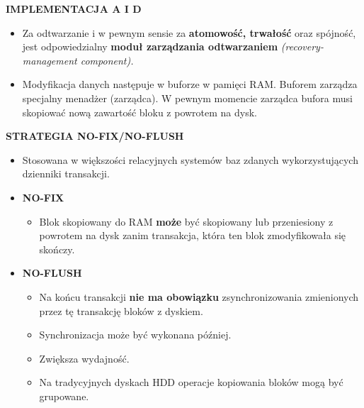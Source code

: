 \documentclass[a5paper,6pt]{article}
\begin{document}
    \textbf{IMPLEMENTACJA A I D}
    \begin{itemize}
        \item Za odtwarzanie i w pewnym sensie za \textbf{atomowość, trwałość}
              oraz spójność, jest odpowiedzialny \textbf{moduł zarządzania
              odtwarzaniem} \textit{(recovery-management component).}

        \item Modyfikacja danych następuje w buforze w pamięci RAM. Buforem
              zarządza specjalny menadżer (zarządca). W pewnym momencie zarządca
              bufora musi skopiować nową zawartość bloku z powrotem na dysk.
    \end{itemize}

    \textbf{STRATEGIA NO-FIX/NO-FLUSH}
    \begin{itemize}
        \item Stosowana w większości relacyjnych systemów baz zdanych
              wykorzystujących dzienniki transakcji.

        \item \textbf{NO-FIX}
        \begin{itemize}
            \item Blok skopiowany do RAM \textbf{może} być skopiowany lub
                  przeniesiony z powrotem na dysk zanim transakcja, która ten
                  blok zmodyfikowała się skończy.
        \end{itemize}

        \item \textbf{NO-FLUSH}
        \begin{itemize}
            \item Na końcu transakcji \textbf{nie ma obowiązku}
                  zsynchronizowania zmienionych przez tę transakcję bloków
                  z dyskiem.
            \item Synchronizacja może być wykonana później.
            \item Zwiększa wydajność.
            \item Na tradycyjnych dyskach HDD operacje kopiowania bloków mogą
                  być grupowane.
        \end{itemize}
    \end{itemize}
\end{document}
